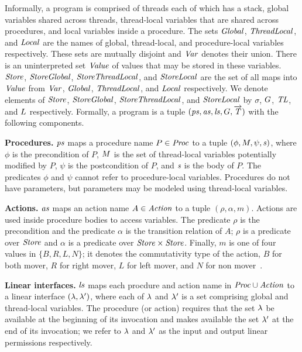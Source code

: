 Informally, a \civl program is comprised of threads each of which has a stack, global variables shared across threads, 
thread-local variables that are shared across procedures, and local variables inside a procedure.
The sets $\mathit{Global}$, $\mathit{ThreadLocal}$, and $\mathit{Local}$ are the names of global, thread-local, and procedure-local variables 
respectively.
These sets are mutually disjoint and $\mathit{Var}$ denotes their union.
There is an uninterpreted set $\mathit{Value}$ of values that may be stored in these variables.
$\mathit{Store}$, $\mathit{StoreGlobal}$, $\mathit{StoreThreadLocal}$, and $\mathit{StoreLocal}$ are the set of all maps into $\mathit{Value}$
from $\mathit{Var}$, $\mathit{Global}$, $\mathit{ThreadLocal}$, and $\mathit{Local}$ respectively.
We denote elements of $\mathit{Store}$, $\mathit{StoreGlobal}$, $\mathit{StoreThreadLocal}$, and $\mathit{StoreLocal}$
by $\sigma$, $G$, $\mathit{TL}$, and $L$ respectively.
Formally, a \civl program is a tuple $(\mathit{ps}, \mathit{as}, \mathit{ls}, G, \overrightarrow{\mathit{T}})$ with the following components.

\noindent
{\bf Procedures.}
$\mathit{ps}$ maps a procedure name $P \in \mathit{Proc}$ to a tuple $(\phi, M, \psi, \mathit{s})$, 
where $\phi$ is the precondition of $P$, $M$ is the set of thread-local variables potentially modified by $P$, 
$\psi$ is the postcondition of $P$, and $\mathit{s}$ is the body of $P$.
The predicates $\phi$ and $\psi$ cannot refer to procedure-local variables.
Procedures do not have parameters, but parameters may be modeled using thread-local variables.

\noindent
{\bf Actions.}
$\mathit{as}$ maps an action name $A \in \mathit{Action}$ to a tuple $(\rho,\alpha,m)$.
Actions are used inside procedure bodies to access variables.
The predicate $\rho$ is the precondition and the predicate $\alpha$ is the transition relation of $A$;
$\rho$ is a predicate over $\mathit{Store}$ and $\alpha$ is a predicate over $\mathit{Store} \times \mathit{Store}$.
Finally, $m$ is one of four values in $\{B,R,L,N\}$;
it denotes the commutativity type of the action, $B$ for both mover, $R$ for right mover, $L$ for left mover, 
and $N$ for non mover~\cite{FlanaganFLQ08}. 

\noindent
{\bf Linear interfaces.}
$\mathit{ls}$ maps each procdure and action name in $\mathit{Proc} \cup \mathit{Action}$ to a linear interface 
$(\lambda,\lambda')$, where each of $\lambda$ and $\lambda'$ is a set comprising global and thread-local variables.
The procedure (or action) requires that the set $\lambda$ be available at the beginning of its invocation 
and makes available the set $\lambda'$ at the end of its invocation; 
we refer to $\lambda$ and $\lambda'$ as the input and output linear permissions respectively.


